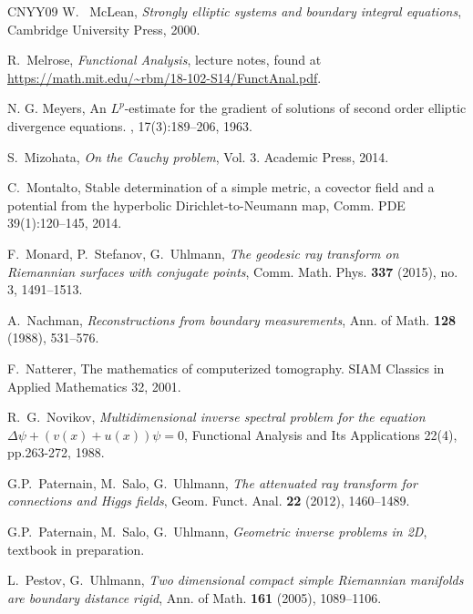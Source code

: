 \documentclass[12pt,twoside]{amsart}
\numberwithin{equation}{section}
\begin{document}
\begin{thebibliography}{CNYY09}
W. \ McLean, \textit{{Strongly elliptic systems and boundary integral equations}}, Cambridge University Press, 2000.




R.\ Melrose, \textit{{Functional Analysis}}, lecture notes, found at \url{https://math.mit.edu/~rbm/18-102-S14/FunctAnal.pdf}.

N. G. Meyers,
\newblock An {$ L^{p} $}-estimate for the gradient of solutions of second order
  elliptic divergence equations.
, 17(3):189--206, 1963.

S.\ Mizohata, \textit{On the Cauchy problem}, Vol. 3. Academic Press, 2014.

C.\ Montalto, Stable determination of a simple metric, a covector field and a potential from the hyperbolic Dirichlet-to-Neumann map, Comm. PDE 39(1):120--145, 2014.



F.\ Monard, P.\ Stefanov, G.\ Uhlmann, \textit{{The geodesic ray transform on Riemannian surfaces with conjugate points}}, Comm. Math. Phys. {\bf 337} (2015), no. 3, 1491--1513.



A.\ Nachman,
\textit{{Reconstructions from boundary measurements}},
Ann. of Math. {\bf 128} (1988), 531--576.

F.\ Natterer, The mathematics of computerized tomography. SIAM Classics in Applied Mathematics 32, 2001.

R.\ G.\ Novikov, \textit{{Multidimensional inverse spectral problem for the equation {$\Delta \psi +(v (x)+u (x)) \psi= 0$}}}, Functional Analysis and Its Applications 22(4), pp.263-272, 1988.


 G.P.\ Paternain, M.\ Salo, G.\ Uhlmann, {\it The attenuated ray transform for connections and Higgs fields},  Geom. Funct. Anal. {\bf 22} (2012), 1460--1489.

 G.P.\ Paternain, M.\ Salo, G.\ Uhlmann, {\it Geometric inverse problems in 2D}, textbook in preparation.

 L.\ Pestov, G.\ Uhlmann,
{\it Two dimensional compact simple Riemannian manifolds are
boundary distance rigid},
Ann. of Math. {\bf 161} (2005), 1089--1106.


\end{thebibliography}
\end{document}
